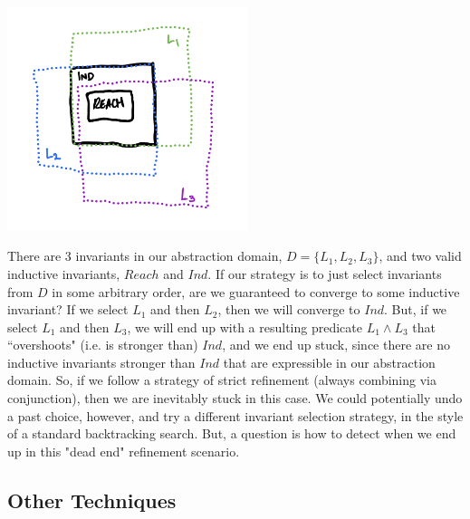\documentclass[10pt]{article}
\begin{document}

\begin{center}
    \includegraphics[width=70mm]{invs1.png}  
\end{center}


There are 3 invariants in our abstraction domain, $D=\{L_1, L_2, L_3\}$, and two valid inductive invariants, $Reach$ and $Ind$. If our strategy is to just select invariants from $D$ in some arbitrary order, are we guaranteed to converge to some inductive invariant? If we select $L_1$ and then $L_2$, then we will converge to $Ind$. But, if we select $L_1$ and then $L_3$, we will end up with a resulting predicate $L_1 \wedge L_3$ that ``overshoots" (i.e. is stronger than) $Ind$, and we end up stuck, since there are no inductive invariants stronger than $Ind$ that are expressible in our abstraction domain. So, if we follow a strategy of strict refinement (always combining via conjunction), then we are inevitably stuck in this case. We could potentially undo a past choice, however, and try a different invariant selection strategy, in the style of a standard backtracking search. But, a question is how to detect when we end up in this "dead end" refinement scenario.

\subsection*{Other Techniques}
\end{document}
